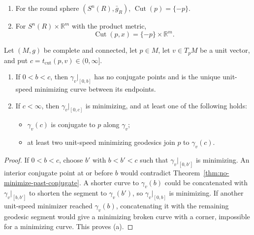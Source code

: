 \begin{example}
\label{ex:cut-loci}
\begin{enumerate}
\item[(a)] For the round sphere $(S^n(R),\bar g_R)$,
$\operatorname{Cut}(p)=\{-p\}$.
\item[(b)] For $S^n(R)\times\mathbb R^m$ with the product metric,
\[
\operatorname{Cut}(p,x)=\{-p\}\times\mathbb R^m.
\]
\end{enumerate}
\end{example}

\begin{proposition}
\label{prop:properties-of-cut-times}
Let $(M,g)$ be complete and connected, let $p\in M$, let
$v\in T_pM$ be a unit vector, and put
$c=t_{\mathrm{cut}}(p,v)\in(0,\infty]$.
\begin{enumerate}
\item[(a)] If $0<b<c$, then $\gamma_v|_{[0,b]}$ has no conjugate points and
is the unique unit-speed minimizing curve between its endpoints.
\item[(b)] If $c<\infty$, then $\gamma_v|_{[0,c]}$ is minimizing, and at
least one of the following holds:
\begin{itemize}
\item $\gamma_v(c)$ is conjugate to $p$ along $\gamma_v$;
\item at least two unit-speed minimizing geodesics join $p$ to $\gamma_v(c)$.
\end{itemize}
\end{enumerate}

\begin{proof}
\sketch If $0<b<c$, choose $b'$ with $b<b'<c$ such that
$\gamma_v|_{[0,b']}$ is minimizing. An interior conjugate point at or before
$b$ would contradict
Theorem~\ref{thm:no-minimize-past-conjugate}. A shorter curve to
$\gamma_v(b)$ could be concatenated with $\gamma_v|_{[b,b']}$ to shorten the
segment to $\gamma_v(b')$, so $\gamma_v|_{[0,b]}$ is minimizing. If another
unit-speed minimizer reached $\gamma_v(b)$, concatenating it with the remaining
geodesic segment would give a minimizing broken curve with a corner, impossible
for a minimizing curve. This proves (a).


\end{proof}
\end{proposition}
